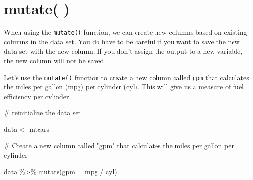 \documentclass[
  letterpaper,
  DIV=11,
  numbers=noendperiod]{scrreprt}
\newenvironment{Shaded}{\begin{snugshade}}{\end{snugshade}}
\newcommand{\AttributeTok}[1]{\textcolor[rgb]{0.40,0.45,0.13}{#1}}
\newcommand{\CommentTok}[1]{\textcolor[rgb]{0.37,0.37,0.37}{#1}}
\newcommand{\FunctionTok}[1]{\textcolor[rgb]{0.28,0.35,0.67}{#1}}
\newcommand{\NormalTok}[1]{\textcolor[rgb]{0.00,0.23,0.31}{#1}}
\newcommand{\OtherTok}[1]{\textcolor[rgb]{0.00,0.23,0.31}{#1}}
\newcommand{\SpecialCharTok}[1]{\textcolor[rgb]{0.37,0.37,0.37}{#1}}
\begin{document}
\section*{mutate( )}\label{mutate}


When using the \texttt{mutate()} function, we can create new columns
based on existing columns in the data set. You do have to be careful if
you want to save the new data set with the new column. If you don't
assign the output to a new variable, the new column will not be saved.

Let's use the \texttt{mutate()} function to create a new column called
\texttt{gpm} that calculates the miles per gallon (mpg) per cylinder
(cyl). This will give us a measure of fuel efficiency per cylinder.

\begin{Shaded}
\begin{Highlighting}[]
\CommentTok{\# reinitialize the data set}

\NormalTok{data }\OtherTok{\textless{}{-}}\NormalTok{ mtcars}

\CommentTok{\# Create a new column called "gpm" that calculates the miles per gallon per cylinder}

\NormalTok{data }\SpecialCharTok{\%\textgreater{}\%}
  \FunctionTok{mutate}\NormalTok{(}\AttributeTok{gpm =}\NormalTok{ mpg }\SpecialCharTok{/}\NormalTok{ cyl)}
\end{Highlighting}
\end{Shaded}
\end{document}
